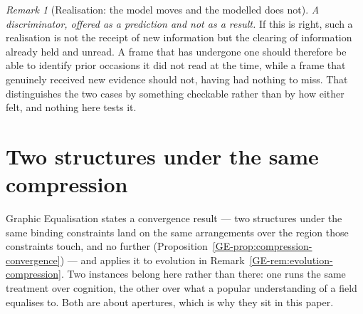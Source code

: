 \documentclass[11pt,a4paper]{article}
\theoremstyle{remark}\newtheorem{remark}[definition]{Remark}
\begin{document}
\begin{remark}[Realisation: the model moves and the modelled does not]
\emph{A discriminator, offered as a prediction and not as a result.} If this is right, such a
realisation is not the receipt of new information but the clearing of information already held and
unread. A frame that has undergone one should therefore be able to identify prior occasions it did not
read at the time, while a frame that genuinely received new evidence should not, having had nothing to
miss. That distinguishes the two cases by something checkable rather than by how either felt, and
nothing here tests it.
\end{remark}

\section{Two structures under the same compression}\label{sec:compression}
Graphic Equalisation states a convergence result --- two structures under the same binding
constraints land on the same arrangements over the region those constraints touch, and no
further (Proposition~\ref{GE-prop:compression-convergence}) --- and applies it to evolution in
Remark~\ref{GE-rem:evolution-compression}. Two instances belong here rather than
there: one runs the same treatment over cognition, the other over what a popular
understanding of a field equalises to. Both are about apertures, which
is why they sit in this paper.
\end{document}
